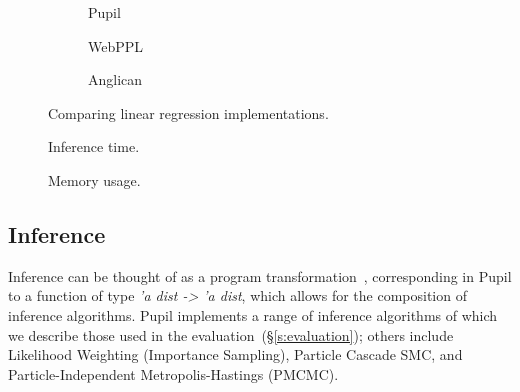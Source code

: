 \documentclass[sigconf]{acmart}
\newcommand{\s}[1]{(\S\ref{#1})}
\newcommand{\pupil}{Pupil\xspace}
\begin{document}
\begin{figure}
  \begin{subfigure}[t]{\linewidth}
    \caption{\label{lst:linreg:pupil}\pupil}
  \end{subfigure}
  \quad
  \begin{subfigure}[t]{\linewidth}
    \caption{\label{lst:linreg:webppl}WebPPL}
  \end{subfigure}
  \quad
  \begin{subfigure}[t]{\linewidth}
    \caption{\label{lst:linreg:anglican}Anglican}
  \end{subfigure}
  \caption{\label{lst:linreg}Comparing linear regression implementations.}
\end{figure}
\begin{figure*}
  \centering
  \begin{subfigure}[t]{\textwidth}
    \centering
    
    \caption{\label{fig:time-perf}
      Inference time.}
  \end{subfigure}
  \begin{subfigure}[t]{\textwidth}
    \centering
    
    \caption{\label{fig:mem-perf}
      Memory usage.}
  \end{subfigure}
  \caption{\pupil performance on different models, taking 10,000 samples from the posterior and averaging over 20 runs. Results shown for Metropolis-Hastings (\emph{mh}), Bootstrap Particle Filter (\emph{smc}), and Rejection Sampling (\emph{rej}). Error bars show the 95\% confidence interval. }
\end{figure*}


\subsection{Inference}
Inference can be thought of as a program transformation~\cite{scibior2015practical, Zinkov2016ComposingIA}, corresponding in \pupil to a function of type \emph{'a dist -> 'a dist}, which allows for the composition of inference algorithms. \pupil implements a range of inference algorithms of which we describe those used in the evaluation~\s{s:evaluation}; others include Likelihood Weighting (Importance Sampling), Particle Cascade SMC, and Particle-Independent Metropolis-Hastings (PMCMC).
\end{document}
